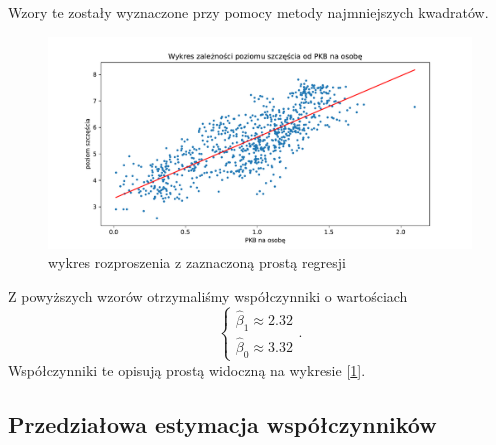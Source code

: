 \documentclass{article}
\theoremstyle{break}
\begin{document}
Wzory te zostały wyznaczone przy pomocy metody najmniejszych kwadratów.

\begin{figure}[H]
	\begin{center}
		\includegraphics[scale=0.43]{plot2.pdf}
		\caption{wykres rozproszenia z zaznaczoną prostą regresji}
		\label{fig:prosta}
	\end{center}
\end{figure}

Z powyższych wzorów otrzymaliśmy współczynniki o wartościach
\begin{equation}
	\left\{ \begin{array}{ll}
		\hat{\beta}_{1} \approx 2.32\\
		\hat{\beta}_{0} \approx 3.32
	\end{array} \right..
\end{equation}
Współczynniki te opisują prostą widoczną na wykresie [\ref{fig:prosta}].

\subsection{Przedziałowa estymacja współczynników}
\end{document}
